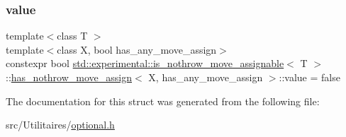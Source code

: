 \subsubsection{\texorpdfstring{value}{value}}
{\footnotesize\ttfamily template$<$class T $>$ \\
template$<$class X, bool has\+\_\+any\+\_\+move\+\_\+assign$>$ \\
constexpr bool \mbox{\hyperlink{structstd_1_1experimental_1_1is__nothrow__move__assignable}{std\+::experimental\+::is\+\_\+nothrow\+\_\+move\+\_\+assignable}}$<$ T $>$\+::\mbox{\hyperlink{structstd_1_1experimental_1_1is__nothrow__move__assignable_1_1has__nothrow__move__assign}{has\+\_\+nothrow\+\_\+move\+\_\+assign}}$<$ X, has\+\_\+any\+\_\+move\+\_\+assign $>$\+::value = false\hspace{0.3cm}{\ttfamily [static]}}



The documentation for this struct was generated from the following file\+:\begin{DoxyCompactItemize}
\item 
src/\+Utilitaires/\mbox{\hyperlink{optional_8h}{optional.\+h}}\end{DoxyCompactItemize}
